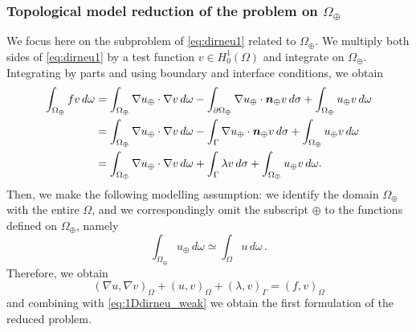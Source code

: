 \subsubsection*{Topological model reduction of the problem on $\Omega_{\oplus}$}
We focus here on the subproblem of \eqref{eq:dirneu1} related to $\Omega_{\oplus}$.
We multiply both sides of \eqref{eq:dirneu1} by a test function $v\in H^1_0(\Omega)$ and integrate on $\Omega_\oplus$. Integrating by parts and using boundary and interface conditions, we obtain
\begin{equation*}
\begin{split}
\int_{\Omega _{\oplus}}fv\,d\omega&=
\int _{\Omega _{\oplus}}\nabla u_{\oplus} \cdot\nabla v\,d\omega -\int _{\partial \Omega _{\oplus}}\nabla u_{\oplus} \cdot \boldsymbol n_{\oplus} v\,d\sigma + \int_{\Omega_{\oplus}} u_{\oplus} v \,d\omega
\\
&=\int _{\Omega _{\oplus}}\nabla u_{\oplus} \cdot\nabla v\,d\omega -\int_{\Gamma} \nabla u_{\oplus} \cdot \boldsymbol n_{\oplus} v\,d\sigma + \int_{\Omega_{\oplus}} u_{\oplus} v\,d\omega
\\
&=\int _{\Omega _{\oplus}}\nabla u_{\oplus} \cdot\nabla v\,d\omega +\int_{\Gamma} \lambda v\,d\sigma + \int_{\Omega_{\oplus}} u_{\oplus} v\,d\omega.
\end{split}
\end{equation*} 
Then, we make the following modelling assumption:
we identify the domain $\Omega_{\oplus}$ with the entire $\Omega$, 
and we correspondingly omit the subscript $\oplus$ to the functions defined on $\Omega_{\oplus}$,
namely
\begin{equation*}
\int_{\Omega_{\oplus}} u_\oplus\, d\omega \simeq \int_{\Omega} u\, d\omega\,.
\end{equation*}
Therefore, we obtain 
\begin{equation*}
(\nabla u ,\nabla v)_{\Omega} +(u,v)_{\Omega}+(\lambda, v)_{\Gamma}  =(f,v)_{\Omega}
\end{equation*}
and combining with \eqref{eq:1Ddirneu_weak} we obtain the first formulation of the reduced problem.

